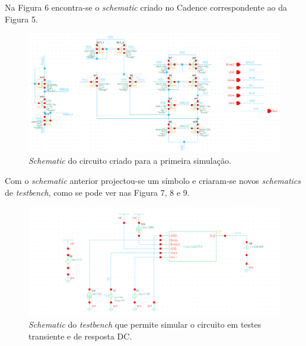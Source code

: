 \documentclass[11pt]{article}
\numberwithin{equation}{section}
\begin{document}
Na Figura 6 encontra-se o \textit{schematic} criado no Cadence correspondente ao da Figura 5.

\begin{figure}[H]
	\centering
	\includegraphics[keepaspectratio=true, scale=0.70]{exps/Woriginais}
	\vspace{-0.5em}
	\caption{\textit{Schematic} do circuito criado para a primeira simulação.}
	\label{fig:schematic1}
	\vspace{-0.8em}
\end{figure} 

Com o \textit{schematic} anterior projectou-se um símbolo e criaram-se novos \textit{schematics} de \textit{testbench}, como se pode ver nas Figura 7, 8 e 9.

\begin{figure}[H]
	\centering
	\includegraphics[keepaspectratio=true, scale=0.25]{exps/TBdctrans}
	\vspace{-0.5em}
	\caption{\textit{Schematic} do \textit{testbench} que permite simular o circuito em testes transiente e de resposta DC.}
	\vspace{-0.8em}
\end{figure} 
\end{document}
